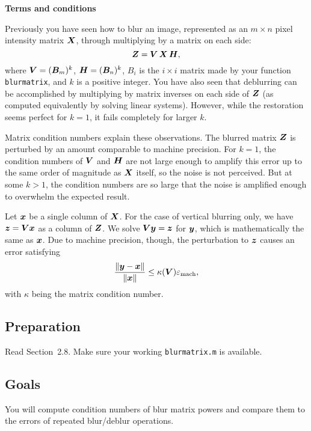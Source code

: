 \documentclass[11pt]{article}
\begin{document}
\begin{center}
  \bf Terms and conditions
\end{center}

Previously you have seen how to blur an image, represented as an
$m\times n$ pixel intensity matrix $\bm{X}$, through multiplying by a matrix on each side:
\begin{equation}
  \label{eq:2}
   \bm{Z}=\bm{V}\, \bm{X} \, \bm{H},
\end{equation}
where $\bm{V} = (\bm{B}_m)^k$, $\bm{H} = (\bm{B}_n)^k$, 
$B_i$ is the $i\times i$ matrix made by your function
\texttt{blurmatrix}, and $k$ is a positive integer. You have also seen that deblurring can be accomplished by multiplying by matrix inverses on each side of $\bm{Z}$ (as computed equivalently by solving linear systems). However, while the restoration seems perfect for $k=1$, it fails completely for larger $k$.

Matrix condition numbers explain these observations. The blurred matrix $\bm{Z}$ is perturbed by an amount comparable to machine precision. For $k=1$, the condition numbers of $\bm{V}$ and $\bm{H}$ are not large enough to amplify this error up to the same order of magnitude as $\bm{X}$ itself, so the noise is not perceived. But at some $k>1$, the condition numbers are so large that the noise is amplified enough to overwhelm the expected result.

Let $\bm{x}$ be a single column of $\bm{X}$. For the case of vertical blurring only, we have $\bm{z}=\bm{V}\bm{x}$ as a column of $\bm{Z}$. We solve $\bm{V} \bm{y} = \bm{z}$ for $\bm{y}$, which is mathematically the same as $\bm{x}$. Due to machine precision, though, the perturbation to $\bm{z}$ causes an error satisfying
\begin{equation}
	\label{bound}
	\frac{\|\bm{y}-\bm{x}\|}{\|\bm{x}\|} \le \kappa(\bm{V})\varepsilon_{\text{mach}},
\end{equation}
with $\kappa$ being the matrix condition number. 

\subsection*{Preparation}

Read Section~2.8. Make sure your working \texttt{blurmatrix.m} is available. 

\subsection*{Goals}

You will compute condition numbers of blur matrix powers and compare them to the errors of repeated blur/deblur operations. 
\end{document}
